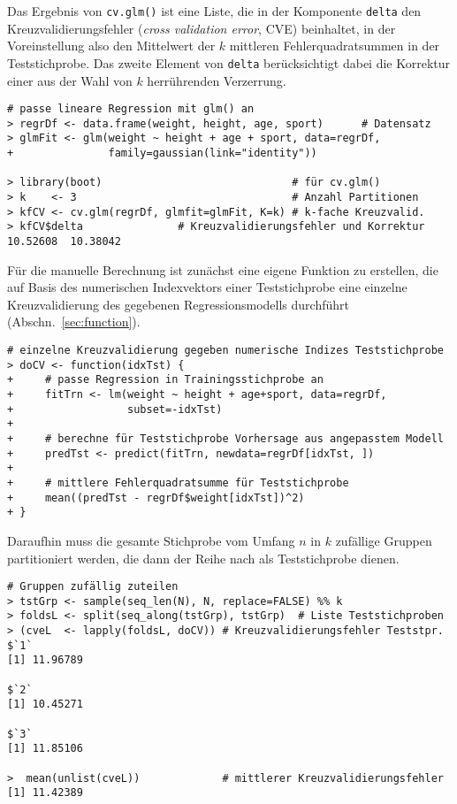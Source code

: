 Das Ergebnis von \lstinline!cv.glm()! ist eine Liste, die in der Komponente \lstinline!delta! den Kreuzvalidierungsfehler (\emph{cross validation error}, CVE) beinhaltet, in der Voreinstellung also den Mittelwert der $k$ mittleren Fehlerquadratsummen in der Teststichprobe. Das zweite Element von \lstinline!delta! berücksichtigt dabei die Korrektur einer aus der Wahl von $k$ herrührenden Verzerrung.
\begin{lstlisting}
# passe lineare Regression mit glm() an
> regrDf <- data.frame(weight, height, age, sport)      # Datensatz
> glmFit <- glm(weight ~ height + age + sport, data=regrDf,
+               family=gaussian(link="identity"))

> library(boot)                              # für cv.glm()
> k    <- 3                                  # Anzahl Partitionen
> kfCV <- cv.glm(regrDf, glmfit=glmFit, K=k) # k-fache Kreuzvalid.
> kfCV$delta               # Kreuzvalidierungsfehler und Korrektur
10.52608  10.38042
\end{lstlisting}

Für die manuelle Berechnung ist zunächst eine eigene Funktion zu erstellen, die auf Basis des numerischen Indexvektors einer Teststichprobe eine einzelne Kreuzvalidierung des gegebenen Regressionsmodells durchführt (Abschn.\ \ref{sec:function}).
\begin{lstlisting}
# einzelne Kreuzvalidierung gegeben numerische Indizes Teststichprobe
> doCV <- function(idxTst) {
+     # passe Regression in Trainingsstichprobe an
+     fitTrn <- lm(weight ~ height + age+sport, data=regrDf,
+                  subset=-idxTst)
+
+     # berechne für Teststichprobe Vorhersage aus angepasstem Modell
+     predTst <- predict(fitTrn, newdata=regrDf[idxTst, ])
+
+     # mittlere Fehlerquadratsumme für Teststichprobe
+     mean((predTst - regrDf$weight[idxTst])^2)
+ }
\end{lstlisting}

Daraufhin muss die gesamte Stichprobe vom Umfang $n$ in $k$ zufällige Gruppen partitioniert werden, die dann der Reihe nach als Teststichprobe dienen.
\begin{lstlisting}
# Gruppen zufällig zuteilen
> tstGrp <- sample(seq_len(N), N, replace=FALSE) %% k
> foldsL <- split(seq_along(tstGrp), tstGrp)  # Liste Teststichproben
> (cveL  <- lapply(foldsL, doCV)) # Kreuzvalidierungsfehler Teststpr.
$`1`
[1] 11.96789

$`2`
[1] 10.45271

$`3`
[1] 11.85106

>  mean(unlist(cveL))             # mittlerer Kreuzvalidierungsfehler
[1] 11.42389
\end{lstlisting}

